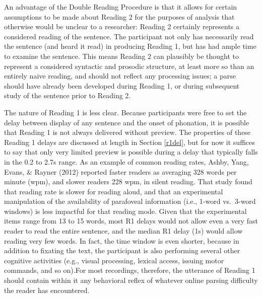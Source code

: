 \documentclass[11pt,oneside]{book}
\begin{document}
An advantage of the Double Reading Procedure is that it allows for certain assumptions to be made about Reading 2 for the purposes of analysis that otherwise would be unclear to a researcher: Reading 2 certainly represents a considered reading of the sentence. The participant not only has necessarily read the sentence (and heard it read) in producing Reading 1, but has had ample time to examine the sentence. This means Reading 2 can plausibly be thought to represent a considered syntactic and prosodic structure, at least more so than an entirely naive reading, and should not reflect any processing issues; a parse should have already been developed during Reading 1, or during subsequent study of the sentence prior to Reading 2.

The nature of Reading 1 is less clear. Because participants were free to set the delay between display of any sentence and the onset of phonation, it is possible that Reading 1 is not always delivered without preview. The properties of these Reading 1 delays are discussed at length in Section \ref{r1del}, but for now it suffices to say that only very limited preview is possible during a delay that typically falls in the 0.2 to 2.7s range. As an example of common reading rates, Ashby, Yang, Evans, \& Rayner (2012) reported faster readers as averaging 328 words per minute (wpm), and slower readers 228 wpm, in silent reading. That study found that reading rate is slower for reading aloud, and that an experimental manipulation of the availability of parafoveal information (i.e., 1-word vs.~3-word windows) is less impactful for that reading mode. Given that the experimental items range from 13 to 15 words, most R1 delays would not allow even a very fast reader to read the entire sentence, and the median R1 delay (1s) would allow reading very few words. In fact, the time window is even shorter, because in addition to fixating the text, the participant is also performing several other cognitive activities (e.g., visual processing, lexical access, issuing motor commands, and so on).For most recordings, therefore, the utterance of Reading 1 should contain within it any behavioral reflex of whatever online parsing difficulty the reader has encountered.
\end{document}
